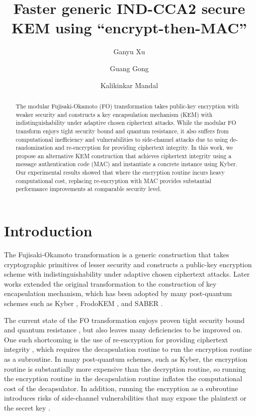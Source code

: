 \documentclass[floatrow,journal=tches,submission]{iacrtrans}
\author{
    Ganyu Xu\inst{1}
    \and Guang Gong\inst{1}
    \and Kalikinkar Mandal\inst{2}
}
\institute{
  University of Waterloo, Waterloo, Canada, \email{{g66xu,ggong}@uwaterloo.ca}
  \and
  University of New Brunswick, New Brunswick, Canada, \email{kmandal@unb.ca}
}
\title{
Faster generic IND-CCA2 secure KEM using ``encrypt-then-MAC''}
\begin{document}
\maketitle




\begin{abstract}
  The modular Fujisaki-Okamoto (FO) transformation takes public-key encryption with weaker security and constructs a key encapsulation mechanism (KEM) with indistinguishability under adaptive chosen ciphertext attacks. While the modular FO transform enjoys tight security bound and quantum resistance, it also suffers from computational inefficiency and vulnerabilities to side-channel attacks due to using de-randomization and re-encryption for providing ciphertext integrity. In this work, we propose an alternative KEM construction that achieves ciphertext integrity using a message authentication code (MAC) and instantiate a concrete instance using Kyber. Our experimental results showed that where the encryption routine incurs heavy computational cost, replacing re-encryption with MAC provides substantial performance improvements at comparable security level.
\end{abstract}


\section{Introduction}
The Fujisaki-Okamoto transformation \cite{fujisaki1999secure} is a generic construction that takes cryptographic primitives of lesser security and constructs a public-key encryption scheme with indistinguishability under adaptive chosen ciphertext attacks. Later works \cite{hofheinz2017modular} extended the original transformation to the construction of key encapsulation mechanism, which has been adopted by many post-quantum schemes such as Kyber \cite{bos2018crystals}, FrodoKEM \cite{bos2016frodo}, and SABER \cite{d2018saber}.

The current state of the FO transformation enjoys proven tight security bound and quantum resistance \cite{hofheinz2017modular}, but also leaves many deficiencies to be improved on. One such shortcoming is the use of re-encryption for providing ciphertext integrity \cite{bernstein2018towards}, which requires the decapsulation routine to run the encryption routine as a subroutine. In many post-quantum schemes, such as Kyber, the encryption routine is substantially more expensive than the decryption routine, so running the encryption routine in the decapsulation routine inflates the computational cost of the decapsulator. In addition, running the encryption as a subroutine introduces risks of side-channel vulnerabilities that may expose the plaintext or the secret key \cite{ravi2019generic}\cite{ueno2022curse}.
\end{document}
